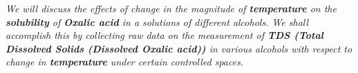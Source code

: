 \textit{We will discuss the effects of change in the magnitude of \textbf{temperature} on the \textbf{solubility} of \textbf{Oxalic acid} in a solutions of different alcohols. We shall accomplish this by collecting raw data on the measurement of \textbf{TDS (Total Dissolved Solids (Dissolved Oxalic acid))} in various alcohols with respect to change in \textbf{temperature} under certain controlled spaces.}

